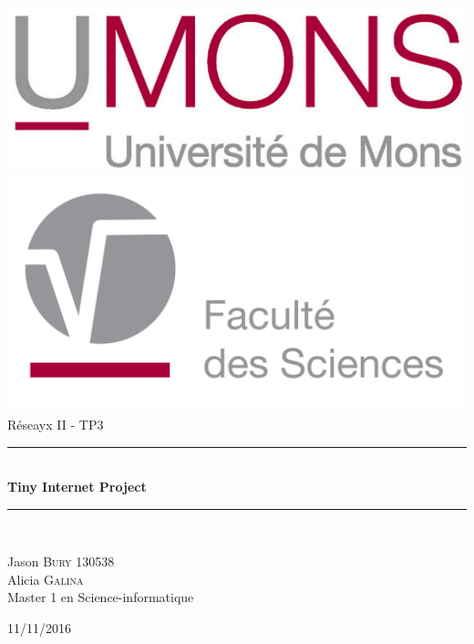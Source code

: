 \begin{titlepage}
\begin{center}
\includegraphics[scale=1.50]{UMONS.jpg}\\[0.4cm]
\includegraphics[scale=0.30]{FS_Logo.jpg}\\[3cm]
{\huge Réseayx II - TP3}\\
\vspace{0.9mm}
\rule{9.5cm}{0.5mm}\\[0.5cm]
{\huge \bfseries Tiny Internet Project}\\[0.2cm]
\rule{9.5cm}{0.5mm}\\[7cm]
      \begin{flushleft} \large
        Jason \textsc{Bury} 130538\\
        Alicia \textsc{Galina} \\%
        Master 1 en Science-informatique\\
      \end{flushleft}
   \vfill
  {\large 11/11/2016}
\end{center}
\end{titlepage}